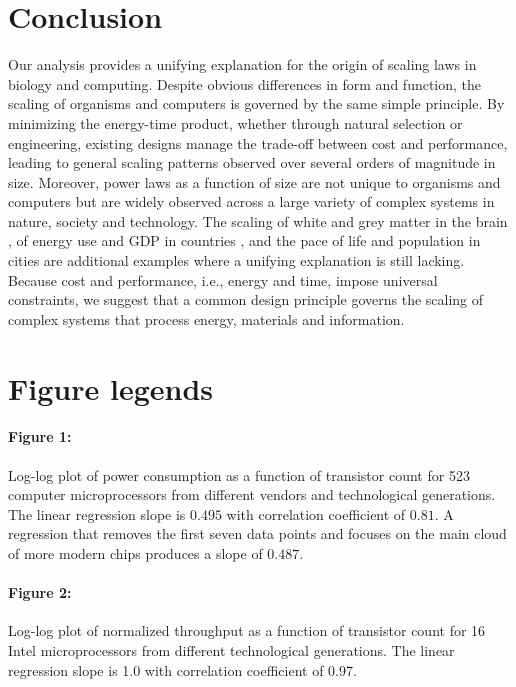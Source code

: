 \documentclass[12pt]{article}
\begin{document}
\section{Conclusion}

Our analysis provides a unifying explanation for the origin of scaling 
laws in biology and computing. Despite obvious differences in form and 
function, the scaling of organisms and computers is governed by the 
same simple principle.  By minimizing the energy-time product, whether 
through natural selection or engineering, existing designs manage the 
trade-off between cost and performance, leading to general scaling 
patterns observed over several orders of magnitude in size.  Moreover, 
power laws as a function of size are not unique to organisms and 
computers but are widely observed across a large variety of complex 
systems in nature, society and technology.  The scaling of white and 
grey matter in the brain \cite{zhang00}, of energy use and GDP in 
countries \cite{brown11}, and the pace of life and population in 
cities \cite{bettencourt07} are additional examples where a unifying 
explanation is still lacking.  Because cost and performance, i.e., 
energy and time, impose universal constraints, we suggest that a 
common design principle governs the scaling of complex systems that 
process energy, materials and information.




\newpage

\section*{Figure legends}
\paragraph{Figure 1:} Log-log plot of power consumption as a function 
of transistor count for 523 computer microprocessors from different 
vendors and technological generations.  The linear regression slope is 
$0.495$ with correlation coefficient of $0.81$. A regression that 
removes the first seven data points and focuses on the main cloud of 
more modern chips produces a slope of $0.487$.

\paragraph{Figure 2:} Log-log plot of normalized throughput as a 
function of transistor count for 16 Intel microprocessors from 
different technological generations.  The linear regression slope is 
1.0 with correlation coefficient of 0.97.
\end{document}

